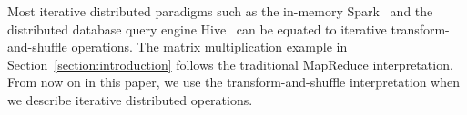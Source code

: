 \documentclass[10pt,journal,compsoc]{IEEEtran}
\begin{document}



Most iterative distributed paradigms such as the in-memory %
Spark~\cite{zaharia2012resilient} and the distributed database query
engine Hive~\cite{thusoo2009hive} can be equated to iterative transform-and-shuffle operations.
The matrix multiplication example in Section~\ref{section:introduction}
follows the traditional MapReduce interpretation. 
From now on in this paper, we use the transform-and-shuffle interpretation when we describe iterative distributed operations.



\end{document}
